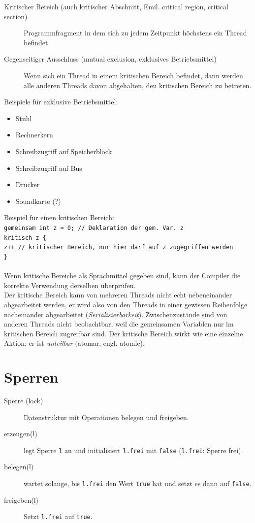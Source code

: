 \begin{description}
\item[Kritischer Bereich (auch kritischer Abschnitt, Emil. critical region, critical section)] Programmfragment in dem sich zu jedem Zeitpunkt höchstens ein Thread befindet.
\item[Gegenseitiger Ausschluss (mutual exclusion, exklusives Betriebsmittel)]
Wenn sich ein Thread in einem kritischen Bereich befindet, dann werden alle anderen Threads davon abgehalten, den kritischen Bereich zu betreten.
\end{description}

Beispiele für exklusive Betriebsmittel:
\begin{itemize}
\item Stuhl
\item Rechnerkern
\item Schreibzugriff auf Speicherblock
\item Schreibzugriff auf Bus
\item Drucker
\item Soundkarte (?)
\end{itemize}

Beispiel für einen kritischen Bereich:\\
\texttt{gemeinsam int z = 0; // Deklaration der gem. Var. z}\\
\texttt{kritisch z \{}\\
\texttt{z++ // kritischer Bereich, nur hier darf auf z zugegriffen werden}\\ %
\texttt{\}}\\
\\
Wenn kritische Bereiche als Sprachmittel gegeben sind, kann der Compiler die korrekte Verwendung derselben überprüfen.\\
Der kritische Bereich kann von mehreren Threads nicht echt nebeneinander abgearbeitet werden, er wird also von den Threads in einer gewissen Reihenfolge nacheinander abgearbeitet (\emph{Serialisierbarkeit}). Zwischenzustände sind von anderen Threads nicht beobachtbar, weil die gemeinsamen Variablen nur im kritischen Bereich zugreifbar sind. Der kritische Bereich wirkt wie eine einzelne Aktion: er ist \emph{unteilbar} (atomar, engl. atomic).

\section{Sperren}
\begin{description}
\item[Sperre (lock)] Datenstruktur mit Operationen belegen und freigeben.
\item[erzeugen(l)] legt Sperre \texttt{l} an und initialisiert \texttt{l.frei} mit \texttt{false} (\texttt{l.frei}: Sperre frei).
\item[belegen(l)] wartet solange, bis \texttt{l.frei} den Wert \texttt{true} hat und setzt es dann auf \texttt{false}.
\item[freigeben(l)] Setzt \texttt{l.frei} auf \texttt{true}.
\end{description}

